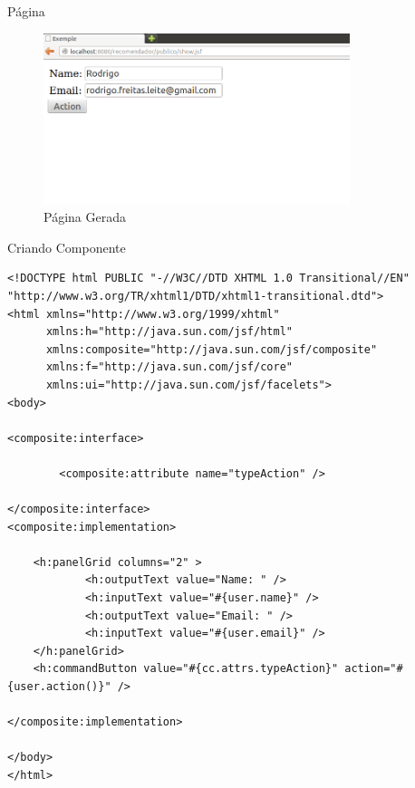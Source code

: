 \documentclass[xcolor=dvipsnames]{beamer}
\begin{document}
\begin{frame}{Página}
	\begin{figure}[!htb]
		\centering
		\includegraphics[keepaspectratio=true,height=5cm]{facelets-1rec.png}
		\caption{Página Gerada}
		\label{rec-ER}
\end{figure}

		\end{frame}

\begin{frame}[fragile]{Criando Componente}
	\begin{lstlisting}[style=HTML]
<!DOCTYPE html PUBLIC "-//W3C//DTD XHTML 1.0 Transitional//EN"
"http://www.w3.org/TR/xhtml1/DTD/xhtml1-transitional.dtd">
<html xmlns="http://www.w3.org/1999/xhtml"
      xmlns:h="http://java.sun.com/jsf/html"
      xmlns:composite="http://java.sun.com/jsf/composite"
      xmlns:f="http://java.sun.com/jsf/core"
      xmlns:ui="http://java.sun.com/jsf/facelets">
<body>

<composite:interface>

		<composite:attribute name="typeAction" />

</composite:interface>
<composite:implementation>

	<h:panelGrid columns="2" >
			<h:outputText value="Name: " />
			<h:inputText value="#{user.name}" />
			<h:outputText value="Email: " />
			<h:inputText value="#{user.email}" />		
	</h:panelGrid>
	<h:commandButton value="#{cc.attrs.typeAction}" action="#{user.action()}" />

</composite:implementation>

</body>
</html>	
	\end{lstlisting}
\end{frame}
\end{document}
